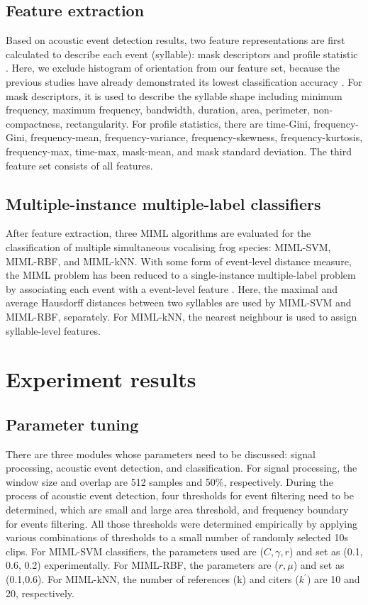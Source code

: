 \subsection{Feature extraction}
Based on acoustic event detection results, two feature representations are first calculated to describe each event (syllable): mask descriptors and profile statistic \cite{briggs2012acoustic}. Here, we exclude histogram of orientation from our feature set, because the previous studies have already demonstrated its lowest classification accuracy \cite{briggs2012acoustic, ruizmultiple2015}. For mask descriptors, it is used to describe the syllable shape including minimum frequency, maximum frequency, bandwidth, duration, area, perimeter, non-compactness, rectangularity. For profile statistics, there are time-Gini, frequency-Gini, frequency-mean, frequency-variance, frequency-skewness, frequency-kurtosis, frequency-max, time-max, mask-mean, and mask standard deviation. The third feature set consists of all features.







\subsection{Multiple-instance multiple-label classifiers}
After feature extraction, three MIML algorithms are evaluated for the classification of multiple simultaneous vocalising frog species: MIML-SVM, MIML-RBF, and MIML-kNN. With some form of event-level distance measure, the MIML problem has been reduced to a single-instance multiple-label problem by associating each event with a event-level feature \cite{briggs2012acoustic}. Here, the maximal and average Hausdorff distances between two syllables are used by MIML-SVM and MIML-RBF, separately. For MIML-kNN, the nearest neighbour is used to assign syllable-level features. 


\section{Experiment results}

\subsection{Parameter tuning}
There are three modules whose parameters need to be discussed: signal processing, acoustic event detection, and classification. For signal processing, the window size and overlap are 512 samples and 50\%, respectively. During the process of acoustic event detection, four thresholds for event filtering need to be determined, which are small and large area threshold, and frequency boundary for events filtering. All those thresholds were determined empirically by applying various combinations of thresholds to a small number of randomly selected 10s clips. For MIML-SVM classifiers, the parameters used are ($C,\gamma,r$) and set as (0.1, 0.6, 0.2) experimentally. For MIML-RBF, the parameters are ($ r, \mu$) and set as (0.1,0.6). For MIML-kNN, the number of references (k) and citers ($k^{'}$) are 10 and 20, respectively.
 
